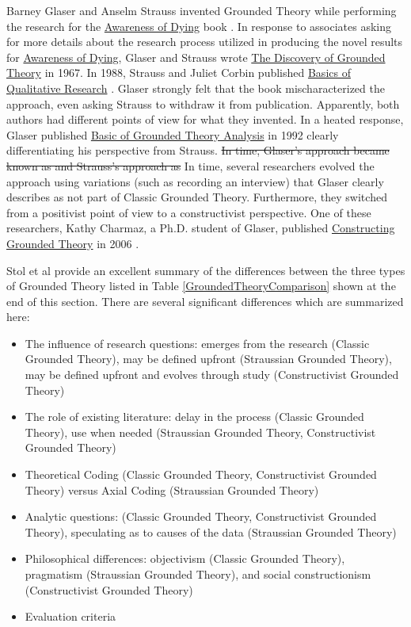 Barney Glaser and Anselm Strauss invented Grounded Theory while performing the research for the \underline{Awareness of Dying} book \cite{GlaserAwarenessOfDying}. In response to associates asking for more details about the research process utilized in producing the novel results for \underline{Awareness of Dying}, Glaser and Strauss wrote \underline{The Discovery of Grounded Theory} \cite{GlaserDiscovery} in 1967. In 1988, Strauss and Juliet Corbin published \underline{Basics of Qualitative Research} \cite{Strauss1988Basics}. Glaser strongly felt that the book mischaracterized the approach, even asking Strauss to withdraw it from publication. Apparently, both authors had different points of view for what they invented. In a heated response, Glaser published \underline{Basic of Grounded Theory Analysis} in 1992 clearly differentiating his perspective from Strauss. \sout{In time, Glaser's approach became known as  and Strauss's approach as } In time, several researchers evolved the approach using variations (such as recording an interview) that Glaser clearly describes as not part of Classic Grounded Theory. Furthermore, they switched from a positivist point of view to a constructivist perspective. One of these researchers, Kathy Charmaz, a Ph.D. student of Glaser, published \underline{Constructing Grounded Theory} in 2006 \cite{Charmaz}. 

Stol et al \cite{StolGroundedTheory} provide an excellent summary of the differences between the three types of Grounded Theory listed in Table \ref{GroundedTheoryComparison} shown at the end of this section. There are several significant differences which are summarized here:
\begin{itemize}
\item The influence of research questions: emerges from the research (Classic Grounded Theory), may be defined upfront (Straussian Grounded Theory), may be defined upfront and evolves through study (Constructivist Grounded Theory)
\item The role of existing literature: delay in the process (Classic Grounded Theory), use when needed (Straussian Grounded Theory, Constructivist Grounded Theory)
\item Theoretical Coding (Classic Grounded Theory, Constructivist Grounded Theory) versus Axial Coding (Straussian Grounded Theory)
\item Analytic questions:  (Classic Grounded Theory, Constructivist Grounded Theory), speculating as to causes of the data (Straussian Grounded Theory)
\item Philosophical differences: objectivism (Classic Grounded Theory), pragmatism (Straussian Grounded Theory), and social constructionism (Constructivist Grounded Theory)
\item Evaluation criteria
\end{itemize}

